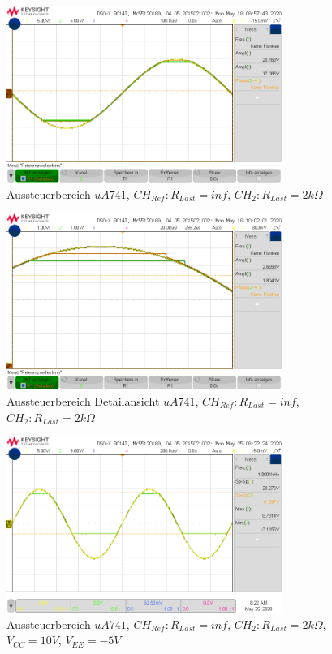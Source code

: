 \begin{figure}[H]
    \centering
    \includegraphics[width=0.8\textwidth]{Lab_1/Messungen/Folger/uberst-schw3.png}
    \caption{Aussteuerbereich $uA741$, $CH_{Ref}: R_{Last} = inf$, $CH_{2}: R_{Last} = 2k\Omega$}
    \label{fig:res_Folger_Aussteuerbereich}
\end{figure}
\begin{figure}[H]
    \centering
    \includegraphics[width=0.8\textwidth]{Lab_1/Messungen/Folger/uberst-schw5.png}
    \caption{Aussteuerbereich Detailansicht $uA741$, $CH_{Ref}: R_{Last} = inf$, $CH_{2}: R_{Last} = 2k\Omega$}
    \label{fig:res_Folger_Aussterbereich_Detailansicht}
\end{figure}

\begin{figure}[H]
    \centering
    \includegraphics[width=0.8\textwidth]{Lab_1/Messungen/Folger/scope_5.png}
    \caption{Aussteuerbereich $uA741$, $CH_{Ref}: R_{Last} = inf$, $CH_{2}: R_{Last} = 2k\Omega$, $V_{CC} = 10V$, $V_{EE} = -5V$}
    \label{fig:res_Folger_VEE_M5V}
\end{figure}

